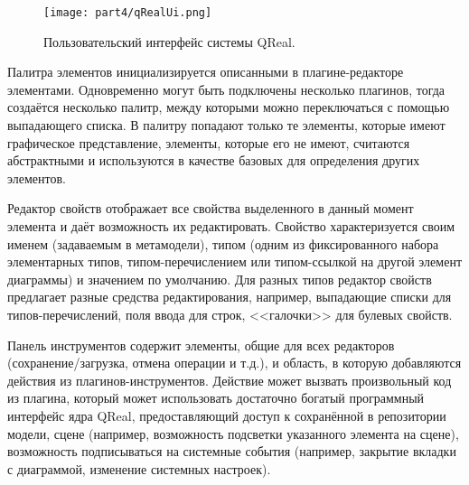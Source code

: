 \begin{figure} [ht]
	\begin{center}
		\texttt{[image: part4/qRealUi.png]}
		\caption{Пользовательский интерфейс системы QReal.}
		\label{qRealUi}
	\end{center}
\end{figure}

Палитра элементов инициализируется описанными в плагине-редакторе элементами. Одновременно 
могут быть подключены несколько плагинов, тогда создаётся  несколько палитр, между 
которыми можно переключаться с помощью выпадающего списка. В палитру попадают только 
те элементы, которые имеют графическое представление, элементы, которые его не имеют, 
считаются абстрактными и используются в качестве базовых для определения других элементов.

Редактор свойств отображает все свойства выделенного в данный момент элемента и даёт 
возможность их редактировать. Свойство характеризуется своим именем (задаваемым в метамодели), 
типом (одним из фиксированного набора элементарных типов, типом-перечислением или 
типом-ссылкой на другой элемент диаграммы) и значением по умолчанию. Для разных типов 
редактор свойств предлагает разные средства редактирования, например, выпадающие списки 
для типов-перечислений, поля ввода для строк, <<галочки>> для булевых свойств.

Панель инструментов содержит элементы, общие для всех редакторов (сохранение/загрузка, 
отмена операции и т.д.), и область, в которую добавляются действия из плагинов-инструментов. 
Действие может вызвать произвольный код из плагина, который может использовать достаточно 
богатый программный интерфейс ядра QReal, предоставляющий доступ к сохранённой в репозитории 
модели, сцене (например, возможность подсветки указанного элемента на сцене), возможность 
подписываться на системные события (например, закрытие вкладки с диаграммой, изменение 
системных настроек).


